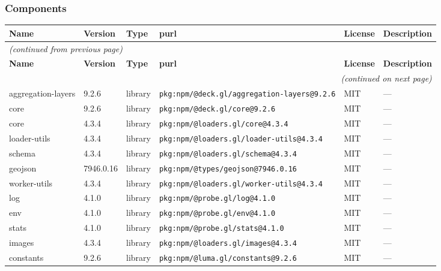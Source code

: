 \documentclass[11pt,a4paper]{article}
\begin{document}
\subsubsection*{Components}
\begin{longtable}{|p{4cm}|p{2cm}|p{1.6cm}|p{5cm}|p{1.5cm}|p{3.5cm}|}
\toprule
\rowcolor{sbomhdr}\textbf{Name} & \textbf{Version} & \textbf{Type} & \textbf{purl} & \textbf{License} & \textbf{Description} \\
\midrule
\endfirsthead
\multicolumn{6}{l}{\small\itshape (continued from previous page)} \\
\toprule
\rowcolor{sbomhdr}\textbf{Name} & \textbf{Version} & \textbf{Type} & \textbf{purl} & \textbf{License} & \textbf{Description} \\
\midrule
\endhead
\midrule
\multicolumn{6}{r}{\small\itshape (continued on next page)} \\
\endfoot
\bottomrule
\endlastfoot
\raggedright aggregation-layers & 9.2.6 & library & \small\texttt{pkg:npm/@deck.gl/aggregation-layers@9.2.6} & MIT & \small — \\
\raggedright core & 9.2.6 & library & \small\texttt{pkg:npm/@deck.gl/core@9.2.6} & MIT & \small — \\
\raggedright core & 4.3.4 & library & \small\texttt{pkg:npm/@loaders.gl/core@4.3.4} & MIT & \small — \\
\raggedright loader-utils & 4.3.4 & library & \small\texttt{pkg:npm/@loaders.gl/loader-utils@4.3.4} & MIT & \small — \\
\raggedright schema & 4.3.4 & library & \small\texttt{pkg:npm/@loaders.gl/schema@4.3.4} & MIT & \small — \\
\raggedright geojson & 7946.0.16 & library & \small\texttt{pkg:npm/@types/geojson@7946.0.16} & MIT & \small — \\
\raggedright worker-utils & 4.3.4 & library & \small\texttt{pkg:npm/@loaders.gl/worker-utils@4.3.4} & MIT & \small — \\
\raggedright log & 4.1.0 & library & \small\texttt{pkg:npm/@probe.gl/log@4.1.0} & MIT & \small — \\
\raggedright env & 4.1.0 & library & \small\texttt{pkg:npm/@probe.gl/env@4.1.0} & MIT & \small — \\
\raggedright stats & 4.1.0 & library & \small\texttt{pkg:npm/@probe.gl/stats@4.1.0} & MIT & \small — \\
\raggedright images & 4.3.4 & library & \small\texttt{pkg:npm/@loaders.gl/images@4.3.4} & MIT & \small — \\
\raggedright constants & 9.2.6 & library & \small\texttt{pkg:npm/@luma.gl/constants@9.2.6} & MIT & \small — \\

\end{longtable}
\end{document}
